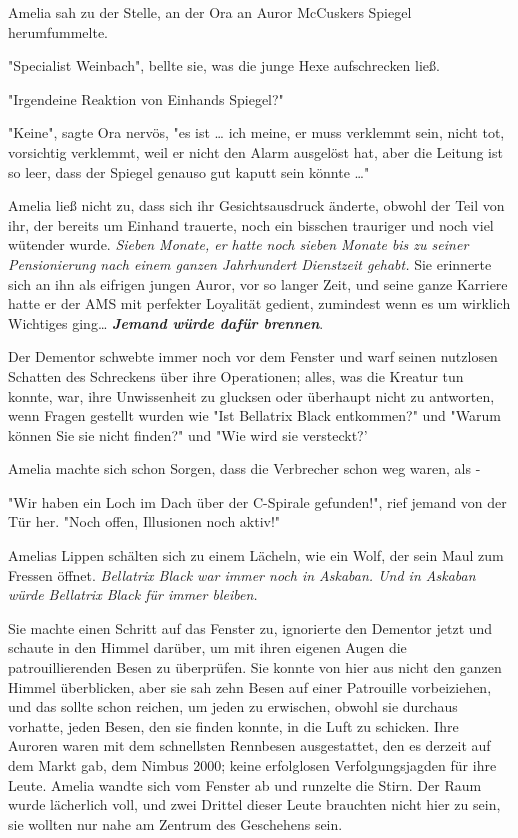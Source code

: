 {Amelia sah zu der Stelle, an der Ora an Auror McCuskers Spiegel herumfummelte.

"Specialist Weinbach", bellte sie, was die junge Hexe aufschrecken ließ.

"Irgendeine Reaktion von Einhands Spiegel?"

"Keine", sagte Ora nervös, "es ist … ich meine, er muss verklemmt sein, nicht tot, vorsichtig verklemmt, weil er nicht den Alarm ausgelöst hat, aber die Leitung ist so leer, dass der Spiegel genauso gut kaputt sein könnte …"

Amelia ließ nicht zu, dass sich ihr Gesichtsausdruck änderte, obwohl der Teil von ihr, der bereits um Einhand trauerte, noch ein bisschen trauriger und noch viel wütender wurde. \emph{Sieben Monate, er hatte noch sieben Monate bis zu seiner Pensionierung nach einem ganzen Jahrhundert Dienstzeit gehabt.} Sie erinnerte sich an ihn als eifrigen jungen Auror, vor so langer Zeit, und seine ganze Karriere hatte er der AMS mit perfekter Loyalität gedient, zumindest wenn es um wirklich Wichtiges ging… \textbf{\emph{Jemand würde dafür brennen}}.

Der Dementor schwebte immer noch vor dem Fenster und warf seinen nutzlosen Schatten des Schreckens über ihre Operationen; alles, was die Kreatur tun konnte, war, ihre Unwissenheit zu glucksen oder überhaupt nicht zu antworten, wenn Fragen gestellt wurden wie "Ist Bellatrix Black entkommen?" und "Warum können Sie sie nicht finden?" und "Wie wird sie versteckt?'

Amelia machte sich schon Sorgen, dass die Verbrecher schon weg waren, als -

"Wir haben ein Loch im Dach über der C-Spirale gefunden!", rief jemand von der Tür her. "Noch offen, Illusionen noch aktiv!"

Amelias Lippen schälten sich zu einem Lächeln, wie ein Wolf, der sein Maul zum Fressen öffnet. \emph{Bellatrix Black war immer noch in Askaban. Und in Askaban würde Bellatrix Black für immer bleiben.}

Sie machte einen Schritt auf das Fenster zu, ignorierte den Dementor jetzt und schaute in den Himmel darüber, um mit ihren eigenen Augen die patrouillierenden Besen zu überprüfen. Sie konnte von hier aus nicht den ganzen Himmel überblicken, aber sie sah zehn Besen auf einer Patrouille vorbeiziehen, und das sollte schon reichen, um jeden zu erwischen, obwohl sie durchaus vorhatte, jeden Besen, den sie finden konnte, in die Luft zu schicken. Ihre Auroren waren mit dem schnellsten Rennbesen ausgestattet, den es derzeit auf dem Markt gab, dem Nimbus 2000; keine erfolglosen Verfolgungsjagden für ihre Leute. Amelia wandte sich vom Fenster ab und runzelte die Stirn. Der Raum wurde lächerlich voll, und zwei Drittel dieser Leute brauchten nicht hier zu sein, sie wollten nur nahe am Zentrum des Geschehens sein.

}
